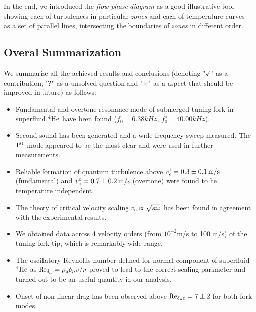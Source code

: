 In the end, we introduced the \textit{flow phase diagram} as a good illustrative tool showing each of turbulences in particular \textit{zones} and each of temperature curves as a set of parallel lines, intersecting the boundaries of \textit{zones} in different order.

\subsection*{Overal Summarization}

We summarize all the achieved results and conclusions (denoting "$ \checkmark $" as a contribution, "\textbf{?}" as a unsolved question and "$ \times $" as a aspect that should be improved in future) as follows:


\begin{itemize}

	
	\item[\checkmark] Fundamental and overtone resonance mode of submerged tuning fork in superfluid $ {}^4\mathrm{He} $ have been found ($ f_0^{\text{f}} = 6.38\unit{kHz} $, $ f_0^{\text{o}} = 40.00\unit{kHz} $).
	
	\item[\checkmark] Second sound has been generated and a wide frequency sweep measured. The $ 1^{\mathrm{st}} $ mode appeared to be the most clear and were used in further measurements.
	
	\item[\checkmark] Reliable formation of quantum turbulence above $ v_{\mathrm{c}}^{\mathrm{{f}}} = 0.3 \pm 0.1 \,\mathrm{m/s}$ (fundamental) and $ v_{\mathrm{c}}^{\mathrm{{o}}} = 0.7 \pm 0.2 \,\mathrm{m/s}$ (overtone) were found to be temperature independent.
	
	\item[\checkmark] The theory of critical velocity scaling $ v_{\mathrm{c}} \propto \sqrt{\kappa\omega}$ has been found in agreement with the experimental results.
	
	\item[\checkmark] We obtained data across 4 velocity orders (from $ 10^{-2} $m/s to 100 m/s) of the tuning fork tip, which is remarkably wide range.
	
	\item[\checkmark] The oscillatory Reynolds number defined for normal component of superfluid $ {}^4\mathrm{He} $ as $\text{Re}_{\delta_{\mathrm{n}}} = \rho_{\mathrm{n}}\delta_{n} v/\eta$ proved to lead to the correct scaling 
	parameter and turned out to be an useful quantity in our analysis.
	
	\item[\checkmark] Onset of non-linear drag has been observed above $ \text{Re}_{\delta_{\mathrm{n}}c}=7\pm 2 $ for both fork modes.
	

\end{itemize}
